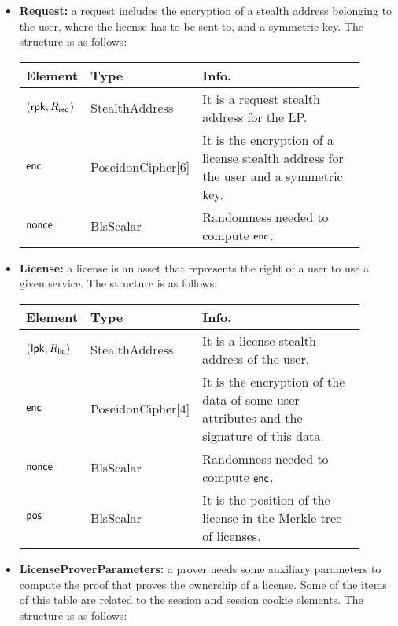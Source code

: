 \begin{itemize}
    \item \textbf{Request:} a request includes the encryption of a stealth address belonging to the user, where the license has to be sent to, and a symmetric key. The structure is as follows:

    \begin{center}
        \begin{tabular}{ | p{0.15\linewidth} | p{0.2\linewidth} | p{0.55\linewidth} | } 
        \hline
        \textbf{Element} & \textbf{Type} & \textbf{Info.} \\
        \hline
        $(\mathsf{rpk}, R_{\mathsf{req}})$ & StealthAddress & It is a request stealth address for the LP. \\
        $\mathsf{enc}$ & PoseidonCipher[6] & It is the encryption of a license stealth address for the user and a symmetric key. \\
        $\mathsf{nonce}$ & BlsScalar & Randomness needed to compute $\mathsf{enc}$. \\ 
        \hline
        \end{tabular}
    \end{center}

    \item \textbf{License:} a license is an asset that represents the right of a user to use a given service. The structure is as follows:

    \begin{center}
        \begin{tabular}{ | p{0.15\linewidth} | p{0.2\linewidth} | p{0.55\linewidth} | } 
        \hline
        \textbf{Element} & \textbf{Type} & \textbf{Info.} \\
        \hline
        $(\mathsf{lpk}, R_{\mathsf{lic}})$ & StealthAddress & It is a license stealth address of the user. \\
        $\mathsf{enc}$ & PoseidonCipher[4] & It is the encryption of the data of some user attributes and the signature of this data. \\
        $\mathsf{nonce}$ & BlsScalar & Randomness needed to compute $\mathsf{enc}$. \\ 
        $\mathsf{pos}$ & BlsScalar & It is the position of the license in the Merkle tree of licenses. \\ 
        \hline
        \end{tabular}
    \end{center}

    \item \textbf{LicenseProverParameters:} a prover needs some auxiliary parameters to compute the proof that proves the ownership of a license. Some of the items of this table are related to the session and session cookie elements. The structure is as follows:


\end{itemize}
